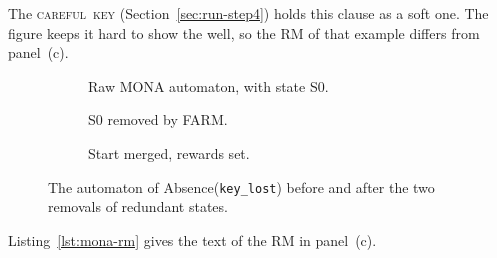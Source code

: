 \documentclass[11pt,english,listoffigures,listoftables]{tfgetsinf}
\newcommand{\runex}[1]{\textsc{#1}}  %
\begin{document}
The \mbox{\runex{careful key}} (Section~\ref{sec:run-step4}) holds this clause as a soft one. The figure keeps it hard to show the well, so the RM of that example differs from panel~(c).

\begin{figure}[H]
    \centering
    \captionsetup[subfigure]{justification=centering}%
    \begin{subfigure}[b]{0.48\textwidth}
        \centering
        \scalebox{0.88}{\begin{tikzpicture}[mona panel, x=0.85cm]
            
        \end{tikzpicture}}
        \caption{Raw MONA automaton, with state S0.}
        \label{fig:mona-pre}
    \end{subfigure}\hfill
    \begin{subfigure}[b]{0.34\textwidth}
        \centering
        \scalebox{0.88}{\begin{tikzpicture}[mona panel, x=0.85cm]
            
        \end{tikzpicture}}
        \caption{S0 removed by FARM.}
        \label{fig:mona-post1}
    \end{subfigure}\hfill
    \begin{subfigure}[b]{0.17\textwidth}
        \centering
        \begin{tikzpicture}[mona panel, x={(0cm,-0.75cm)}]
            
        \end{tikzpicture}
        \caption{Start merged, rewards set.}
        \label{fig:mona-post2}
    \end{subfigure}
    \caption[Redundant states removed from Absence(\texttt{key\_lost})]{The automaton of Absence(\texttt{key\_lost}) before and after the two removals of redundant states.}
    \label{fig:mona-stages}
\end{figure}

Listing~\ref{lst:mona-rm} gives the text of the RM in panel~(c).

\noindent\begin{minipage}{\linewidth}

\end{minipage}
\end{document}
